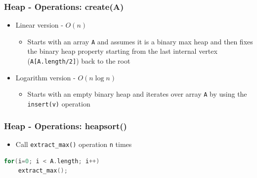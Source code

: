\documentclass{beamer}
\begin{document}
\begin{frame}[fragile]
\frametitle{Heap - Operations: create(A)}
	\begin{itemize}
		\item Linear version - \color{blue} $O(n)$ \color{black}
			\begin{itemize}
				\item Starts with an array \verb|A| and assumes it is a binary max heap and then fixes the binary heap property starting from the last internal vertex (\verb|A[A.length/2]|) back to the root
			\end{itemize}
		\item Logarithm version - \color{blue} $O(n\log n)$ \color{black}
			\begin{itemize}
				\item Starts with an empty binary heap and iterates over array \verb|A| by using the \verb|insert(v)| operation
			\end{itemize}
	\end{itemize}
\end{frame}

\begin{frame}[fragile]
\frametitle{Heap - Operations: heapsort()}
	\begin{itemize}
		\item Call \verb|extract_max()| operation \verb|n| times
	\end{itemize}
	
	\vspace{0.6cm}
	
	\begin{lstlisting}[language=c++]
for(i=0; i < A.length; i++)
	extract_max();
\end{lstlisting}	
\end{frame}



\end{document}
